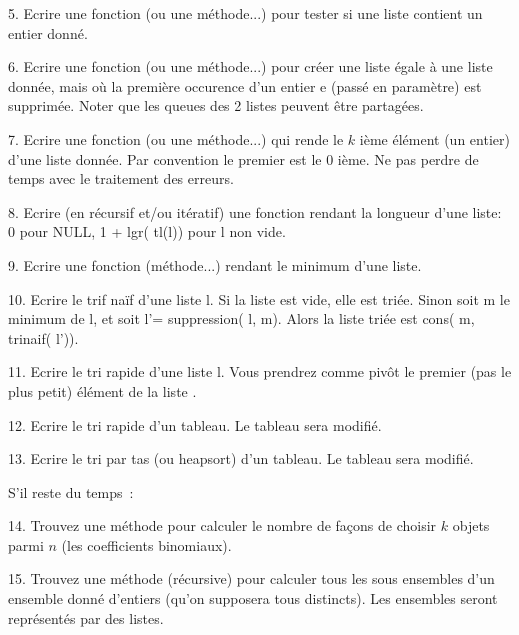\documentclass[a4paper]{article}
\begin{document}
5. Ecrire une fonction (ou une m\'ethode...) pour tester si une liste contient un entier donn\'e.

6. Ecrire une fonction (ou une m\'ethode...) pour cr\'eer une liste \'egale \`a une liste donn\'ee, mais o\`u la premi\`ere occurence d'un entier e (pass\'e en param\`etre) est supprim\'ee. Noter que les queues des 2 listes peuvent \^etre partag\'ees.

7.  Ecrire une fonction (ou une m\'ethode...) qui rende le $k$ i\`eme \'el\'ement (un entier)
d'une liste donn\'ee. Par convention le premier est le 0 i\`eme. Ne pas perdre de temps avec le traitement des erreurs.
  
8. Ecrire (en r\'ecursif et/ou it\'eratif)
une fonction rendant la longueur d'une liste: 0 pour NULL, 1 + lgr( tl(l)) pour l non vide. 

9. Ecrire une fonction (m\'ethode...) rendant le minimum d'une liste.

10. Ecrire le trif na\"if d'une liste l. Si la liste est vide, elle est tri\'ee. Sinon
soit m le minimum de l, et soit l'= suppression( l, m). Alors la liste tri\'ee
est cons( m, trinaif( l')).

11. Ecrire le tri rapide d'une liste l. Vous prendrez comme piv\^ot le premier (pas le plus petit)
\'el\'ement de la liste .

12. Ecrire le tri rapide d'un tableau.  Le tableau sera modifi\'e.

13. Ecrire le tri par tas (ou heapsort) d'un tableau. Le tableau sera modifi\'e.

S'il reste du temps~:

14. Trouvez une m\'ethode pour calculer le nombre de fa\c{c}ons de choisir $k$ objets parmi $n$ (les coefficients binomiaux). 

15. Trouvez une m\'ethode (r\'ecursive) pour calculer tous les sous ensembles d'un ensemble donn\'e d'entiers (qu'on supposera tous distincts). Les ensembles seront repr\'esent\'es par des listes.
\end{document}
